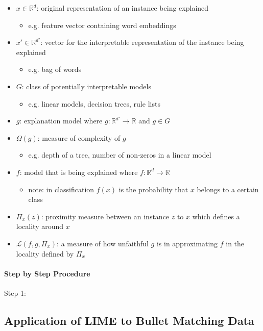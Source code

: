 \documentclass[AMS,STIX1COL]{WileyNJD-v2}
\begin{document}
\begin{itemize}
\item $x\in\mathbb{R}^d$: original representation of an instance being explained
\begin{itemize}
\item e.g. feature vector containing word embeddings
\end{itemize}
\item $x'\in\mathbb{R}^{d'}$: vector for the interpretable representation of the instance being explained
\begin{itemize}
\item e.g. bag of words
\end{itemize}
\item $G$: class of potentially interpretable models
\begin{itemize}
\item e.g. linear models, decision trees, rule lists
\end{itemize}
\item $g$: explanation model where $g:\mathbb{R}^{d'}\rightarrow\mathbb{R}$ and $g\in G$
\item $\Omega(g)$: measure of complexity of $g$
\begin{itemize}
\item e.g. depth of a tree, number of non-zeros in a linear model
\end{itemize}
\item $f$: model that is being explained where $f:\mathbb{R}^d\rightarrow\mathbb{R}$
\begin{itemize}
\item note: in classification $f(x)$ is the probability that $x$ belongs to a certain class
\end{itemize}
\item $\Pi_x(z)$: proximity measure between an instance $z$ to $x$ which defines a locality around $x$
\item $\mathcal{L}(f, g, \Pi_x)$: a measure of how unfaithful $g$ is in approximating $f$ in the locality defined by $\Pi_x$
\end{itemize}

\paragraph{Step by Step Procedure}

Step 1: 

\subsection{Application of LIME to Bullet Matching Data}
\end{document}
